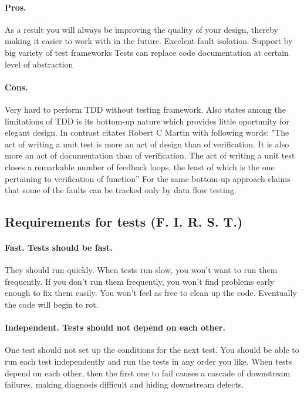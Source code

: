 \documentclass{llncs}
\begin{document}
\paragraph{Pros.}
As a result you will always be improving the quality of your design, thereby making it easier to work with in the future.\cite{tdd}
Excelent fault isolation. Support by big variety of test frameworks \cite{STCraft}
Tests can replace code documentation at certain level of abstraction \cite{MartinClean}

\paragraph{Cons.}
Very hard to perform TDD without testing framework. \cite{STCraft}
Also \cite{STCraft} states among the limitations of TDD is its bottom-up nature which provides little oportunity for elegant design. In contrast \cite{tdd} citates Robert C Martin with following words: "The act of writing a unit test is more an act of design than of verification.  It is also more an act of documentation than of verification.  The act of writing a unit test closes a remarkable number of feedback loops, the least of which is the one pertaining to verification of function”  For the same bottom-up approach \cite{STCraft} claims that some of the faults can be tracked only by data flow testing.


\subsection{Requirements for tests (F. I. R. S. T.)}

\paragraph{Fast. Tests should be fast.} 
They should run quickly. When tests run slow, you won’t want to run them frequently. 
If you don’t run them frequently, you won’t find problems early enough to fix them easily. 
You won’t feel as free to clean up the code. Eventually the code will begin to rot.\cite{MartinClean}

\paragraph{Independent. Tests should not depend on each other.} 
One test should not set up the conditions for the next test. 
You should be able to run each test independently and run the tests in any order you like. 
When tests depend on each other, then the first one to fail causes a cascade of downstream failures, making diagnosis difficult and hiding downstream defects.\cite{MartinClean}
\end{document}
